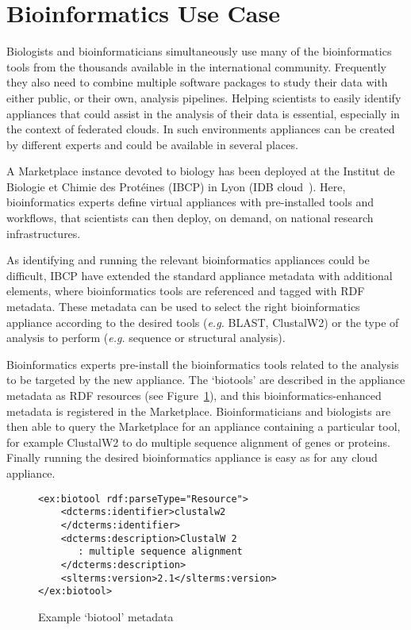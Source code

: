 \section{Bioinformatics Use Case}
\label{sec:bioinfo}

Biologists and bioinformaticians simultaneously use many of the bioinformatics tools from the thousands available in the international community. Frequently they also need to combine multiple software packages to study their data with either public, or their own, analysis pipelines. Helping scientists to easily identify appliances that could assist in the analysis of their data is essential, especially in the context of federated clouds. In such environments appliances can be created by different experts and could be available in several places.

A Marketplace instance devoted to biology has been deployed at the Institut de Biologie et Chimie des Prot\'eines (IBCP) in Lyon (IDB cloud~\cite{idbcloud}). Here, bioinformatics experts define virtual appliances with pre-installed tools and workflows, that scientists can then deploy, on demand, on national research infrastructures.

As identifying and running the relevant bioinformatics appliances could be difficult, IBCP have extended the standard appliance metadata with additional elements, where bioinformatics tools are referenced and tagged with RDF metadata. These metadata can be used to select the right bioinformatics appliance according to the desired tools (\textit{e.g.} BLAST, ClustalW2) or the type of analysis to perform (\textit{e.g.} sequence or structural analysis).

Bioinformatics experts pre-install the bioinformatics tools related to the analysis to be targeted by the new appliance. The `biotools' are described in the appliance metadata as RDF resources (see Figure~\ref{fig:biotool-schema}), and this bioinformatics-enhanced metadata is registered in the Marketplace. Bioinformaticians and biologists are then able to query the Marketplace for an appliance containing a particular tool, for example ClustalW2 to do multiple sequence alignment of genes or proteins. Finally running the desired bioinformatics appliance is easy as for any cloud appliance.

\begin{figure}
 \begin{center}
    \begin{verbatim}
<ex:biotool rdf:parseType="Resource">
    <dcterms:identifier>clustalw2
    </dcterms:identifier>
    <dcterms:description>ClustalW 2
       : multiple sequence alignment
    </dcterms:description>
    <slterms:version>2.1</slterms:version>
</ex:biotool>
    \end{verbatim}
  \end{center}
 \caption{Example `biotool' metadata}
 \label{fig:biotool-schema}
\end{figure}
